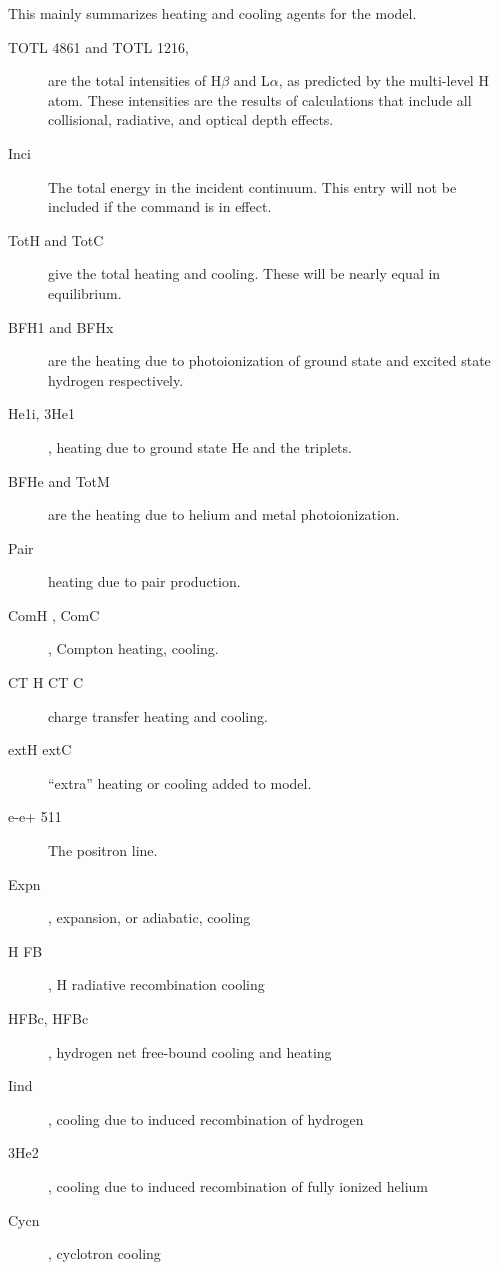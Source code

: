 This mainly summarizes heating and cooling agents for the model.
\begin{description}
\item[TOTL 4861 and TOTL 1216,] are the total intensities of H$\beta$
and L$\alpha $, as
predicted by the multi-level H atom.
These intensities are the results
of calculations that include all collisional, radiative, and optical
depth effects.

\item[Inci]  The total energy in the incident continuum.
This entry will not be included if the  command is in effect.

\item[TotH and TotC] give the total heating and cooling.  These will be nearly
equal in equilibrium.

\item[BFH1 and BFHx] are the heating due to photoionization of ground state
and excited state hydrogen respectively.

\item[He1i, 3He1], heating due to ground state He and the triplets.

\item[BFHe and TotM] are the heating due to helium and metal photoionization.

\item[Pair] heating due to pair production.

\item[ComH , ComC],  Compton heating, cooling.

\item[CT H    CT C] charge transfer heating and cooling.

\item[extH   extC]    ``extra'' heating or cooling added to model.

\item[e-e+  511]  The positron line.

\item[Expn], expansion, or adiabatic, cooling

\item[H FB], H radiative recombination cooling

\item[HFBc, HFBc], hydrogen net free-bound cooling and heating

\item[Iind], cooling due to induced recombination of hydrogen

\item[3He2], cooling due to induced recombination of fully ionized helium

\item[Cycn], cyclotron cooling
\end{description}

